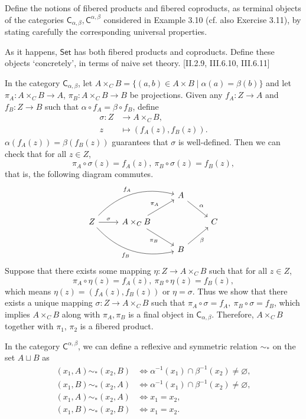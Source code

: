 \documentclass[12pt,letterpaper,boxed]{hmcpset}
\newcommand{\Set}{\mathsf{Set}}
\begin{document}
\begin{problem}[5.12]
	Define the notions of fibered products and fibered coproducts, as terminal objects of the categories $\mathsf{C}_{\alpha,\beta},\mathsf{C}^{\alpha,\beta}$ considered in
	Example 3.10 (cf. also Exercise 3.11), by stating carefully the corresponding
	universal properties.
	
	As it happens, $\Set$ has both fibered products and coproducts. Define these
	objects `concretely', in terms of naive set theory. [II.2.9, III.6.10, III.6.11]
\end{problem}
\begin{solution}
	In the category $\mathsf{C}_{\alpha,\beta}$, let $A\times_C B=\{(a,b)\in A\times B\mid\alpha(a)=\beta(b)\}$ and let $\pi_A:A\times_C B\to A$, $\pi_B:A\times_C B\to B$ be projections. Given any $f_A:Z\to A$ and $f_B:Z\to B$ such that $\alpha\circ f_A=\beta\circ f_B$, define
	\[
	\begin{aligned}
	\sigma:Z&\longrightarrow A\times_C B, \\  
	z&\longmapsto (f_A(z),f_B(z)).
	\end{aligned}
	\]
	$\alpha(f_A(z))=\beta(f_B(z))$ guarantees that $\sigma$ is well-defined. Then we can check that for all $z\in Z$,
	\[
	\pi_A\circ\sigma(z)=f_A(z),\ \pi_B\circ\sigma(z)=f_B(z),
	\]
	that is, the following diagram commutes.
	\[\begin{tikzcd}
	&& A\arrow[dr,"\alpha"]&\\
	Z\arrow[r,"\sigma"]\arrow[urr,bend left,"f_A"]\arrow[drr,bend right,swap,"f_B"]
	&A\times_C B\arrow[ur,"\pi_A"]\arrow[dr,swap,"\pi_B"]&&C \\
	&& B\arrow[ur,swap,"\beta"]&
	\end{tikzcd}\]
	Suppose that there exists some mapping $\eta:Z\to A\times_C B$ such that for all $z\in Z$,
	\[
	\pi_A\circ\eta(z)=f_A(z),\ \pi_B\circ\eta(z)=f_B(z),
	\]
	which means $\eta(z)=(f_A(z),f_B(z))$ or $\eta=\sigma$. Thus we show that there exists a unique mapping $\sigma:Z\to A\times_C B$ such that $\pi_A\circ\sigma=f_A,\ \pi_B\circ\sigma=f_B$, which implies $A\times_C B$ along with $\pi_A,\pi_B$ is a final object in $\mathsf{C}_{\alpha,\beta}$. Therefore, $A\times_C B$ together with $\pi_1$, $\pi_2$ is a fibered product.
	
	In the category $\mathsf{C}^{\alpha,\beta}$, we can define a reflexive and symmetric relation $\sim_*$ on the set $A\sqcup B$ as
	\begin{align*}
	(x_1,A)\sim_* (x_2,B)&\iff \alpha^{-1}(x_1)\cap\beta^{-1}(x_2)\ne\varnothing,\\
	(x_1,B)\sim_* (x_2,A)&\iff \alpha^{-1}(x_1)\cap\beta^{-1}(x_2)\ne\varnothing,\\
	(x_1,A)\sim_*(x_2,A)&\iff x_1=x_2,\\
	(x_1,B)\sim_*(x_2,B)&\iff x_1=x_2.
	\end{align*}


\end{solution}
\end{document}
